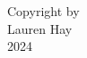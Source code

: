 


\begin{center}
\null
\vfill
\begin{doublespace}
Copyright by \\ 
Lauren Hay \\ 
2024 \\
\end{doublespace}
\end{center}
